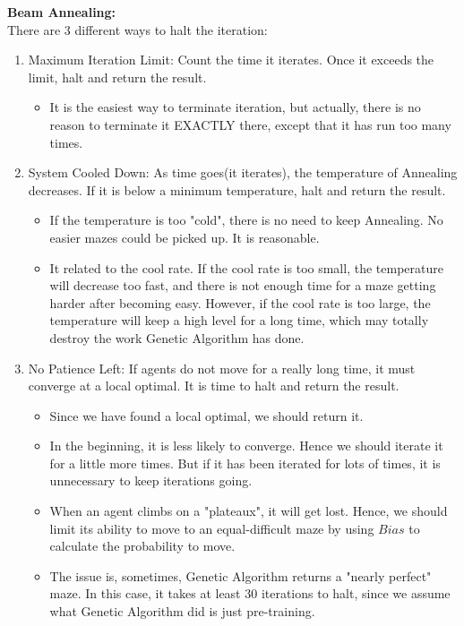 \documentclass[letter]{article}
\begin{document}
\begin{enumerate}[resume]
		\textbf{Beam Annealing:} \\
		There are 3 different ways to halt the iteration: \\
		\begin{enumerate}
			\item {Maximum Iteration Limit: Count the time it iterates. Once it exceeds the limit, halt and return the result.} 
			\begin{itemize}
				\item {It is the easiest way to terminate iteration, but actually, there is no reason to terminate it EXACTLY there, except that it has run too many times.}
			\end{itemize}
		
			\item {System Cooled Down: As time goes(it iterates), the temperature of Annealing decreases. If it is below a minimum temperature, halt and return the result.} 
			\begin{itemize}
				\item {If the temperature is too "cold", there is no need to keep Annealing. No easier mazes could be picked up. It is reasonable.}
				\item {It related to the cool rate. If the cool rate is too small, the temperature will decrease too fast, and there is not enough time for a maze getting harder after becoming easy. However, if the cool rate is too large, the temperature will keep a high level for a long time, which may totally destroy the work Genetic Algorithm has done.}
			\end{itemize}
		
			\item {No Patience Left: If agents do not move for a really long time, it must converge at a local optimal. It is time to halt and return the result.} 
			\begin{itemize}
				\item {Since we have found a local optimal, we should return it.}
				\item {In the beginning, it is less likely to converge. Hence we should iterate it for a little more times. But if it has been iterated for lots of times, it is unnecessary to keep iterations going.}
				\item {When an agent climbs on a "plateaux", it will get lost. Hence, we should limit its ability to move to an equal-difficult maze by using $Bias$ to calculate the probability to move.}
				\item {The issue is, sometimes, Genetic Algorithm returns a "nearly perfect" maze. In this case, it takes at least 30 iterations to halt, since we assume what Genetic Algorithm did is just pre-training.}
			\end{itemize}
		\end{enumerate}
		

\end{enumerate}
\end{document}
